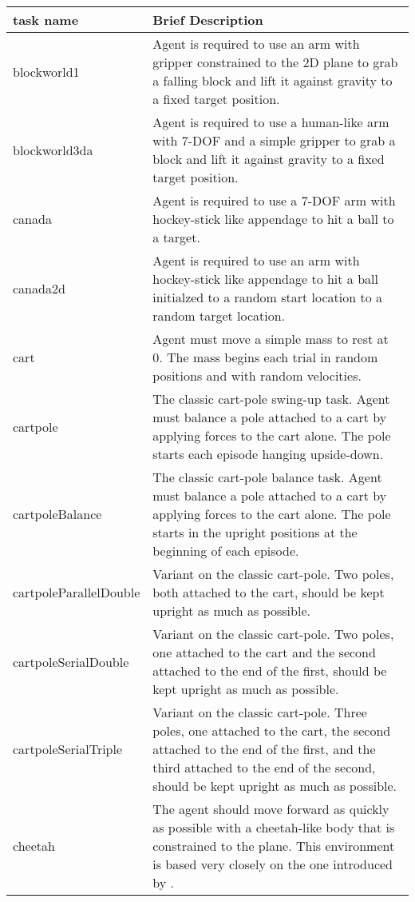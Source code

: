 \documentclass{article} \usepackage{iclr2016_conference,times}
\begin{document}
\setlength{\extrarowheight}{10pt}
\begin{center}
  \begin{longtable}{ l | p{10cm} }
  \textbf{task name } &  \textbf{Brief Description} \\
      \hline
blockworld1                  & Agent is required to use an arm with gripper constrained to the 2D plane to grab a falling block and lift it against gravity to a fixed target position. \\
blockworld3da                & Agent is required to use a human-like arm with 7-DOF and a simple gripper to grab a block and lift it against gravity to a fixed target position. \\
canada                       & Agent is required to use a 7-DOF arm with hockey-stick like appendage to hit a ball to a target. \\
canada2d                     & Agent is required to use an arm with hockey-stick like appendage to hit a ball initialzed to a random start location to a random target location. \\
cart                         & Agent must move a simple mass to rest at 0.  The mass begins each trial in random positions and with random velocities. \\
cartpole                     & The classic cart-pole swing-up task.  Agent must balance a pole attached to a cart by applying forces to the cart alone.  The pole starts each episode hanging upside-down.   \\
cartpoleBalance              & The classic cart-pole balance task.  Agent must balance a pole attached to a cart by applying forces to the cart alone.  The pole starts in the upright positions at the beginning of each episode. \\
cartpoleParallelDouble       & Variant on the classic cart-pole.  Two poles, both attached to the cart, should be kept upright as much as possible. \\
cartpoleSerialDouble         & Variant on the classic cart-pole.  Two poles, one attached to the cart and the second attached to the end of the first, should be kept upright as much as possible. \\
cartpoleSerialTriple         & Variant on the classic cart-pole.  Three poles, one attached to the cart, the second attached to the end of the first, and the third attached to the end of the second, should be kept upright as much as possible. \\
cheetah                      & The agent should move forward as quickly as possible with a cheetah-like body that is constrained to the plane.  This environment is based very closely on the one introduced by \citet{wawrzynski2009real,wawrzynski2013autonomous}. \\

\end{longtable}
\end{center}
\end{document}
